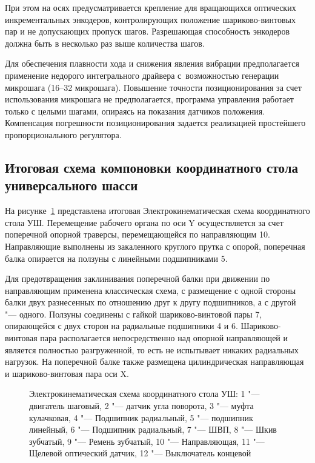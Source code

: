 При этом на осях предусматривается крепление для вращающихся оптических инкрементальных энкодеров, контролирующих положение шариково-винтовых пар и не допускающих пропуск шагов. Разрешающая способность энкодеров должна быть в несколько раз выше количества шагов.

Для обеспечения плавности хода и снижения явления вибрации предполагается применение недорого интегрального драйвера с~возможностью генерации микрошага (16--32 микрошага). Повышение точности позиционирования за счет использования микрошага не предполагается, программа управления работает только с целыми шагами, опираясь на показания датчиков положения. Компенсация погрешности позиционирования задается реализацией простейшего пропорционального регулятора.

\subsection{Итоговая схема компоновки координатного стола универсального шасси}

На рисунке~\cref{fig:scheme} представлена итоговая Электрокинематическая схема координатного стола УШ. Перемещение рабочего органа по оси Y осуществляется за счет поперечной опорной траверсы, перемещающейся по направляющим 10. Направляющие выполнены из закаленного круглого прутка с опорой, поперечная балка опирается на ползуны с линейными подшипниками 5.

Для предотвращения заклинивания поперечной балки при движении по направляющим применена классическая схема, с размещение с одной стороны балки двух разнесенных по отношению друг к другу подшипников, а с другой "--- одного. Ползуны соединены с гайкой шариково-винтовой пары 7, опирающейся с двух сторон на радиальные подшипники 4 и 6. Шариково-винтовая пара располагается непосредственно над опорной направляющей и является полностью разгруженной, то есть не испытывает никаких радиальных нагрузок. На поперечной балке также размещена цилиндрическая направляющая и шариково-винтовая пара оси X.

\begin{figure}[ht]
	\caption[Электрокинематическая схема координатного стола УШ]{Электрокинематическая схема координатного стола УШ: 1 "--- двигатель шаговый, 2 "--- датчик угла поворота, 3 "--- муфта кулачковая, 4 "--- Подшипник радиальный, 5 "--- подшипник линейный, 6 "--- Подшипник радиальный, 7 "--- ШВП, 8 "--- Шкив зубчатый, 9 "--- Ремень зубчатый, 10 "--- Направляющая, 11 "--- Щелевой оптический датчик, 12 "--- Выключатель концевой}\label{fig:scheme}
\end{figure}


